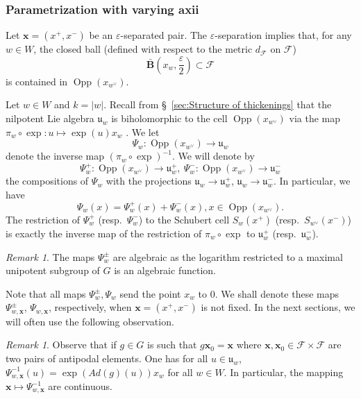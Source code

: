 \documentclass[12pt]{amsbook}%
\theoremstyle{definition}
\theoremstyle{remark}
\newtheorem{rem}[thm]{Remark}
\numberwithin{section}{chapter}
\numberwithin{subsection}{section}
\numberwithin{figure}{chapter}
\DeclareMathOperator{\Opp}{Opp}
\def\dF{d_{\mathcal{F}}}
\def\cF{{\mathscr{F}}}
\def\fu{{\mathfrak{u}}}
\def\fuwp{{\mathfrak{u}_w^+}}
\def\fuwm{{\mathfrak{u}_w^-}}
\def\Psiwp{{\Psi_w^+}}
\def\Psiwm{{\Psi_w^-}}
\def\Swx{{S_w(x^+)}}
\def\Swxd{{S_{w^\vee}(x^-)}}
\def\bx{\mathbf{x}}
\begin{document}
{{\subsubsection{Parametrization with varying axii} \label{sec:parametrization}


Let $\bx=(x^+,x^-)$ be an $\varepsilon$-separated pair. The $\varepsilon$-separation implies that, for any $w\in W$, the closed ball (defined with respect to the metric $\dF$ on $\cF$)  
$$\bar{\mathbf{B}}(x_w,\frac{\varepsilon}{2})\subset \cF$$
is contained in $\Opp(x_{w^\vee})$. 

Let $w\in W$ and $k=\vert w \vert$. Recall from \S~\ref{sec:Structure of thickenings} that the nilpotent Lie algebra $\fu_w$ is biholomorphic to the cell $\Opp(x_{w^\vee})$ via the map $\pi_w\circ \exp : u \mapsto \exp(u) x_{w}$ . We let %
$$\Psi_w:\Opp(x_{w^\vee})\rightarrow \fu_w$$
denote the inverse map $\left(\pi_w\circ \exp\right)^{-1}$.
We will denote by
$$
\Psiwp: \Opp(x_{w^\vee})\rightarrow \fuwp,\ \Psiwm:\Opp(x_{w^\vee})\rightarrow \fuwm
$$
the compositions of $\Psi_w$ with the projections $\fu_w\rightarrow \fuwp$, $\fu_w\rightarrow\fuwm$. In particular, we have
\[
\Psi_w(x)=\Psiwp(x)+\Psiwm(x), x\in \Opp(x_{w^\vee}).
\]
The restriction of $\Psiwp$ (resp.\ $\Psiwm$) to the Schubert cell $\Swx$ (resp.\ $\Swxd$) is exactly the inverse map of the restriction of $\pi_w\circ \exp$ to $\fuwp$ (resp.\ $\fuwm$). 

\begin{rem} \label{rem_algebraic_projections} The maps $\Psi_w^{\pm}$ are algebraic as the logarithm restricted to a maximal 
unipotent subgroup of $G$ is an algebraic function. 
\end{rem}


Note that all maps $\Psi_w^\pm, \Psi_w$ send the point  $x_w$ to $0$. 
We shall denote these maps $\Psi_{w,\bx}^\pm$, $\Psi_{w,\bx}$, respectively, when $\bx=(x^+,x^-)$ is not fixed. In the next sections, we will often use the following observation. 
\begin{rem}\label{rem_continuity_psi_inverse} Observe that if $g \in G$ is such that $g \bx_0 = \bx$ where  $\bx, \bx_0 \in \cF\times \cF$ are two pairs of antipodal elements. One has for all $u \in \mathfrak{u}_w$,  $\Psi_{w,\bx}^{-1} (u) = \exp(Ad(g)(u)) x_{w}$ for all $w \in W$. In particular, 
 the mapping $\bx \mapsto \Psi_{w,\bx}^{-1}$ are continuous. 
\end{rem}

}}
\end{document}
